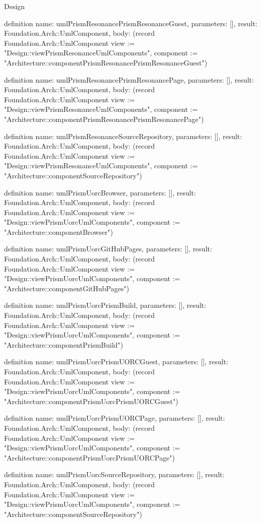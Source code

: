 \begin{lexlean}{Design}
\begin{semanticmodule}
definition{
  name: umlPrismResonancePrismResonanceGuest,
  parameters: [],
  result: Foundation.Arch::UmlComponent,
  body: (record Foundation.Arch::UmlComponent {view := "Design::viewPrismResonanceUmlComponents", component := "Architecture::componentPrismResonancePrismResonanceGuest"})
}

definition{
  name: umlPrismResonancePrismResonancePage,
  parameters: [],
  result: Foundation.Arch::UmlComponent,
  body: (record Foundation.Arch::UmlComponent {view := "Design::viewPrismResonanceUmlComponents", component := "Architecture::componentPrismResonancePrismResonancePage"})
}

definition{
  name: umlPrismResonanceSourceRepository,
  parameters: [],
  result: Foundation.Arch::UmlComponent,
  body: (record Foundation.Arch::UmlComponent {view := "Design::viewPrismResonanceUmlComponents", component := "Architecture::componentSourceRepository"})
}

definition{
  name: umlPrismUorcBrowser,
  parameters: [],
  result: Foundation.Arch::UmlComponent,
  body: (record Foundation.Arch::UmlComponent {view := "Design::viewPrismUorcUmlComponents", component := "Architecture::componentBrowser"})
}

definition{
  name: umlPrismUorcGitHubPages,
  parameters: [],
  result: Foundation.Arch::UmlComponent,
  body: (record Foundation.Arch::UmlComponent {view := "Design::viewPrismUorcUmlComponents", component := "Architecture::componentGitHubPages"})
}

definition{
  name: umlPrismUorcPrismBuild,
  parameters: [],
  result: Foundation.Arch::UmlComponent,
  body: (record Foundation.Arch::UmlComponent {view := "Design::viewPrismUorcUmlComponents", component := "Architecture::componentPrismBuild"})
}

definition{
  name: umlPrismUorcPrismUORCGuest,
  parameters: [],
  result: Foundation.Arch::UmlComponent,
  body: (record Foundation.Arch::UmlComponent {view := "Design::viewPrismUorcUmlComponents", component := "Architecture::componentPrismUorcPrismUORCGuest"})
}

definition{
  name: umlPrismUorcPrismUORCPage,
  parameters: [],
  result: Foundation.Arch::UmlComponent,
  body: (record Foundation.Arch::UmlComponent {view := "Design::viewPrismUorcUmlComponents", component := "Architecture::componentPrismUorcPrismUORCPage"})
}

definition{
  name: umlPrismUorcSourceRepository,
  parameters: [],
  result: Foundation.Arch::UmlComponent,
  body: (record Foundation.Arch::UmlComponent {view := "Design::viewPrismUorcUmlComponents", component := "Architecture::componentSourceRepository"})
}


\end{semanticmodule}
\end{lexlean}
